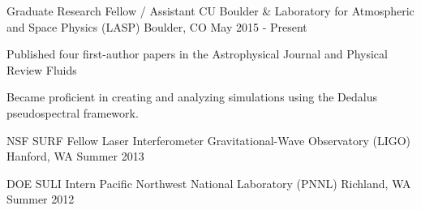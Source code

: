 

\begin{cventries}

  \cventry
    {Graduate Research Fellow / Assistant} %
    {CU Boulder \& Laboratory for Atmospheric and Space Physics (LASP)} %
    {Boulder, CO} %
    {May 2015 - Present} %
    {
      \begin{cvitems} %
	  	\item { Published four first-author papers in the Astrophysical Journal and Physical Review Fluids }
        \item { Became proficient in creating and analyzing simulations using the Dedalus pseudospectral framework. }
      \end{cvitems}
    }

  \cventry
    {NSF SURF Fellow} %
    {Laser Interferometer Gravitational-Wave Observatory (LIGO)} %
    {Hanford, WA} %
    {Summer 2013} %
    {
    }

  \cventry
    {DOE SULI Intern} %
    {Pacific Northwest National Laboratory (PNNL)} %
    {Richland, WA} %
    {Summer 2012} %
    {
    }


\end{cventries}
